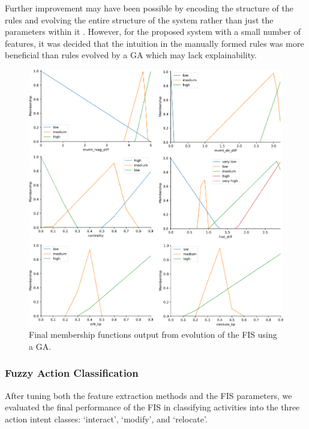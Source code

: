 \documentclass[12pt]{report}
\begin{document}
Further improvement may have been possible by encoding the structure of the rules and evolving the entire structure of the system rather than just the parameters within it \cite{Wong2000OptimizationAlgorithm}. However, for the proposed system with a small number of features, it was decided that the intuition in the manually formed rules was more beneficial than rules evolved by a GA which may lack explainability.

\begin{figure}[t]
\centerline{\includegraphics[width=.95\linewidth]{figure/final_mem_funcs.png}}
\caption{Final membership functions output from evolution of the FIS using a GA.}
\label{final_mem_funcs}
\end{figure}

\subsubsection{Fuzzy Action Classification}
After tuning both the feature extraction methods and the FIS parameters, we evaluated the final performance of the FIS in classifying activities into the three action intent classes: `interact', `modify', and `relocate'.
\end{document}
